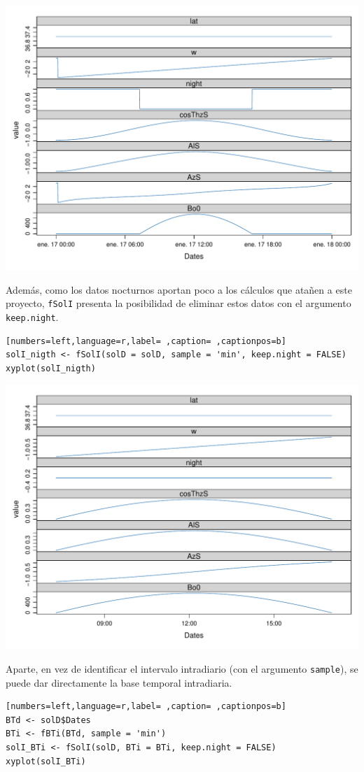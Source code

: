 \begin{center}
\includegraphics[width=\textwidth]{figuras/codigo-solI.pdf}
\end{center}
  Además, como los datos nocturnos aportan poco a los cálculos que atañen a este proyecto, \texttt{fSolI} presenta la posibilidad de eliminar estos datos con el argumento \texttt{keep.night}.
\begin{lstlisting}[numbers=left,language=r,label= ,caption= ,captionpos=b]
solI_nigth <- fSolI(solD = solD, sample = 'min', keep.night = FALSE)
xyplot(solI_nigth)
\end{lstlisting}

\begin{center}
\includegraphics[width=\textwidth]{figuras/codigo-solInight.pdf}
\end{center}
  Aparte, en vez de identificar el intervalo intradiario (con el argumento \texttt{sample}), se puede dar directamente la base temporal intradiaria.
\begin{lstlisting}[numbers=left,language=r,label= ,caption= ,captionpos=b]
BTd <- solD$Dates
BTi <- fBTi(BTd, sample = 'min')
solI_BTi <- fSolI(solD, BTi = BTi, keep.night = FALSE)
xyplot(solI_BTi)
\end{lstlisting}


